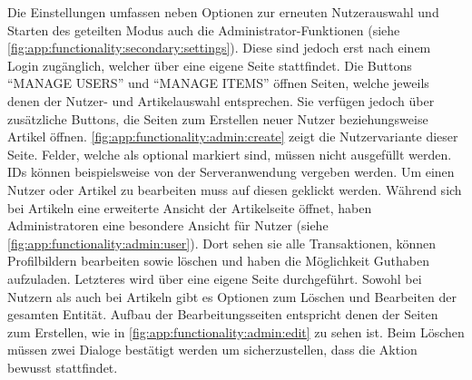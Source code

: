 Die Einstellungen umfassen neben Optionen zur erneuten Nutzerauswahl und Starten des geteilten Modus auch die Administrator-Funktionen (siehe \autoref{fig:app:functionality:secondary:settings}).
Diese sind jedoch erst nach einem Login zugänglich, welcher über eine eigene Seite stattfindet.
Die Buttons "`MANAGE  USERS"' und "`MANAGE ITEMS"' öffnen Seiten, welche jeweils denen der Nutzer- und Artikelauswahl entsprechen.
Sie verfügen jedoch über zusätzliche Buttons, die Seiten zum Erstellen neuer Nutzer beziehungsweise Artikel öffnen.
\autoref{fig:app:functionality:admin:create} zeigt die Nutzervariante dieser Seite.
Felder, welche als optional markiert sind, müssen nicht ausgefüllt werden.
IDs können beispielsweise von der Serveranwendung vergeben werden.
Um einen Nutzer oder Artikel zu bearbeiten muss auf diesen geklickt werden.
Während sich bei Artikeln eine erweiterte Ansicht der Artikelseite öffnet, haben Administratoren eine besondere Ansicht für Nutzer (siehe \autoref{fig:app:functionality:admin:user}).
Dort sehen sie alle Transaktionen, können Profilbildern bearbeiten sowie löschen und haben die Möglichkeit Guthaben aufzuladen.
Letzteres wird über eine eigene Seite durchgeführt.
Sowohl bei Nutzern als auch bei Artikeln gibt es Optionen zum Löschen und Bearbeiten der gesamten Entität.
Aufbau der Bearbeitungsseiten entspricht denen der Seiten zum Erstellen, wie in \autoref{fig:app:functionality:admin:edit} zu sehen ist.
Beim Löschen müssen zwei Dialoge bestätigt werden um sicherzustellen, dass die Aktion bewusst stattfindet.
